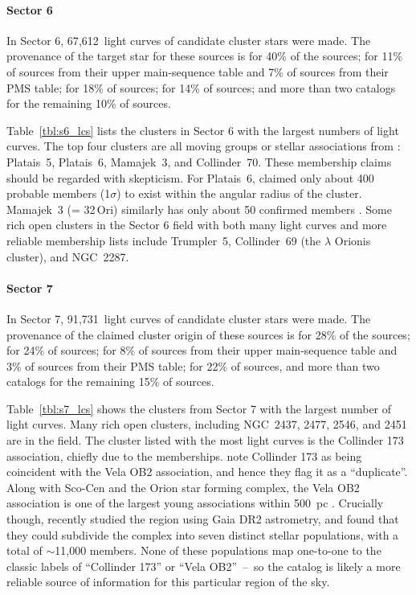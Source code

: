 \documentclass[12pt,twocolumn,tighten]{aastex62}
\newcommand{\sVInumberlcs}{67{,}612\ }  %
\newcommand{\sVIInumberlcs}{91{,}731\ }  %
\begin{document}
\paragraph{Sector 6}

In Sector 6, \sVInumberlcs light curves of candidate cluster stars
were made. The provenance of the target star for these sources is
\citet{dias_proper_2014} for 40\% of the sources; \citet{zari_3d_2018}
for 11\% of sources from their upper main-sequence table and 7\% of
sources from their PMS table; \citet{Kharchenko_et_al_2013} for 18\%
of sources; \citet{cantat-gaudin_gaia_2018} for 14\% of sources; and
more than two catalogs for the remaining 10\% of sources.

Table~\ref{tbl:s6_lcs} lists the clusters in Sector 6 with the largest
numbers of light curves. The top four clusters are all moving groups
or stellar associations from \citet{dias_proper_2014}: Platais~5,
Platais~6, Mamajek~3, and Collinder~70.  These membership claims
should be regarded with skepticism.  For Platais~6,
\citet{Kharchenko_et_al_2013} claimed only about 400 probable members
(1$\sigma$) to exist within the angular radius of the cluster.
Mamajek~3 (= 32$\,$Ori) similarly has only about 50 confirmed members
\citep{bell_32ori_2017}.  Some rich open clusters in the Sector 6
field with both many light curves and more reliable membership lists
include Trumpler~5, Collinder~69 (the $\lambda$ Orionis cluster), and
NGC~2287.


\paragraph{Sector 7}

In Sector 7, \sVIInumberlcs light curves of candidate cluster stars
were made.  The provenance of the claimed cluster origin of these
sources is \citet{dias_proper_2014} for 28\% of the sources;
\citet{Kharchenko_et_al_2013} for 24\% of sources;
\citet{zari_3d_2018} for 8\% of sources from their upper main-sequence
table and 3\% of sources from their PMS table;
\citet{cantat-gaudin_gaia_2018} for 22\% of sources, and more than two
catalogs for the remaining 15\% of sources.

Table~\ref{tbl:s7_lcs} shows the clusters from Sector 7 with the
largest number of light curves.  Many rich open clusters, including
NGC~2437, 2477, 2546, and 2451 are in the field.  The cluster listed
with the most light curves is the Collinder 173 association, chiefly
due to the \citet{dias_proper_2014} memberships.
\citet{Kharchenko_et_al_2013} note Collinder 173 as being coincident
with the Vela OB2 association, and hence they flag it as a
``duplicate''.  Along with Sco-Cen and the Orion star forming complex,
the Vela OB2 association is one of the largest young associations
within 500~pc \citep{zari_3d_2018}.  Crucially though,
\citet{cantat-gaudin_velaOB2_2019} recently studied the region using
Gaia DR2 astrometry, and found that they could subdivide the complex
into seven distinct stellar populations, with a total of $\sim$11,000
members.  None of these populations map one-to-one to the classic
labels of ``Collinder 173'' or ``Vela OB2''~--~so the
\citet{cantat-gaudin_velaOB2_2019} catalog is likely a more reliable
source of information for this particular region of the sky.
\end{document}
